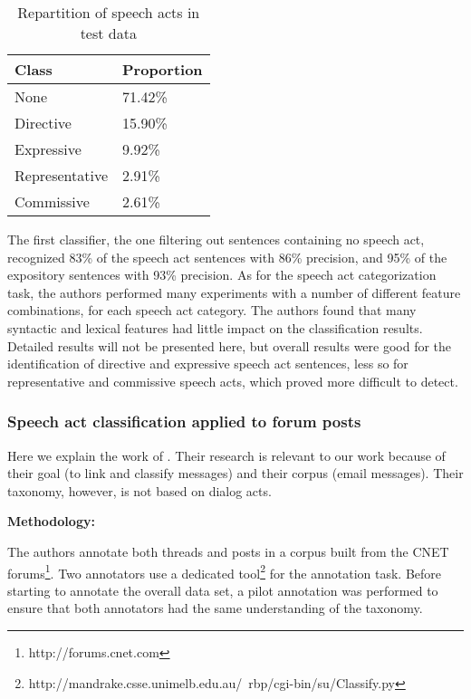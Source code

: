 \documentclass[11pt]{article}
\begin{document}
\begin{table}
	\begin{tabularx}{\textwidth}{Y Y}
		\toprule
		Class & Proportion \\
		\midrule
		None & 71.42\% \\
		Directive & 15.90\% \\
		Expressive & 9.92\% \\
		Representative & 2.91\% \\
		Commissive & 2.61\% \\
		\bottomrule
	\end{tabularx}
	\caption{Repartition of speech acts in \cite{qadir2011classifying} test data}
	\label{fig:qadirRepartition}
\end{table}

The first classifier, the one filtering out sentences containing no speech act, recognized 83\% of the speech act sentences with 86\% precision, and 95\% of the expository  sentences with 93\% precision. As for the speech act categorization task, the authors performed many experiments with a number of different feature combinations, for each speech act category. The authors found that many syntactic and lexical features had little impact on the classification results. Detailed results will not be presented here, but overall results were good for the identification of directive and expressive speech act sentences, less so for representative and commissive speech acts, which proved more difficult to detect.

\subsubsection{Speech act classification applied to forum posts}

Here we explain the work of \cite{kim2010taggingandlinking}. Their research is relevant to our work because of their goal (to link and classify messages) and their corpus (email messages). Their taxonomy, however, is not based on dialog acts.

\vspace{0.5cm}
\textbf{Methodology:}
\vspace{0.1cm}

The authors annotate both threads and posts in a corpus built from the CNET forums\footnote{http://forums.cnet.com}. Two annotators use a dedicated tool\footnote{http://mandrake.csse.unimelb.edu.au/~rbp/cgi-bin/su/Classify.py} for the annotation task. Before starting to annotate the overall data set, a pilot annotation was performed to ensure that both annotators had the same understanding of the taxonomy.
\end{document}
